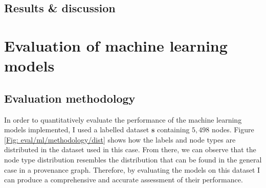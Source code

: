 	\subsection{Results \& discussion} \label{Section: eval/features/results}
		
	\section{Evaluation of machine learning models} \label{Section: eval/ml}
	\subsection{Evaluation methodology} \label{Section: eval/ml/methodology}
		In order to quantitatively evaluate the performance of the machine learning models implemented, I used a labelled dataset $\mathbf{s}$ containing $5,498$ nodes. Figure \ref{Fig: eval/ml/methodology/dist} shows how the labels and node types are distributed in the dataset used in this case. From there, we can observe that the node type distribution resembles the distribution that can be found in the general case in a provenance graph. Therefore, by evaluating the models on this dataset I can produce a comprehensive and accurate assessment of their performance. 
